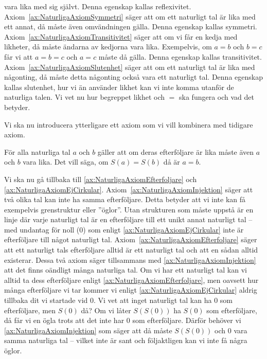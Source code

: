 vara lika med sig självt.
Denna egenskap kallas reflexivitet.
Axiom~\ref{ax:NaturligaAxiomSymmetri} säger att om ett naturligt tal är lika
med ett annat, då måste även omvändningen gälla.
Denna egenskap kallas symmetri.
Axiom~\ref{ax:NaturligaAxiomTransitivitet} säger att om vi får en kedja med
likheter, då måste ändarna av kedjorna vara lika.
Exempelvis, om \(a=b\) och \(b=c\) får vi att \(a=b=c\) och \(a=c\) måste då
gälla.
Denna egenskap kallas transitivitet.
Axiom~\ref{ax:NaturligaAxiomSlutenhet} säger att om ett naturligt tal är lika
med någonting, då måste detta någonting också vara ett naturligt tal.
Denna egenskap kallas slutenhet, hur vi än använder likhet kan
vi inte komma utanför de naturliga talen.
Vi vet nu hur begreppet likhet och \(=\) ska fungera och vad det betyder.

Vi ska nu introducera ytterligare ett axiom som vi vill kombinera med
tidigare axiom.
\begin{axiom}\label{ax:NaturligaAxiomInjektion}
  För alla naturliga tal \(a\) och \(b\) gäller att om deras efterföljare är
  lika måste även \(a\) och \(b\) vara lika.
  Det vill säga, om \(S(a)=S(b)\) då är \(a=b\).
\end{axiom}
Vi ska nu gå tillbaka till \cref{ax:NaturligaAxiomEfterfoljare} och
\cref{ax:NaturligaAxiomEjCirkular}.
Axiom~\ref{ax:NaturligaAxiomInjektion} säger att två olika tal kan inte ha 
samma efterföljare.
Detta betyder att vi inte kan få exempelvis grenstruktur eller ''öglor''.
Utan strukturen som måste uppstå är en linje där varje naturligt tal är en 
efterföljare till ett unikt annat naturligt tal -- med undantag för noll 
(\(0\)) som enligt \cref{ax:NaturligaAxiomEjCirkular} inte är efterföljare 
till något naturligt tal.
Axiom~\ref{ax:NaturligaAxiomEfterfoljare} säger att ett naturligt tals 
efterföljare alltid är ett naturligt tal och att en sådan alltid existerar.
Dessa två axiom säger tillsammans med \cref{ax:NaturligaAxiomInjektion} att
det finns oändligt många naturliga tal.
Om vi har ett naturligt tal kan vi alltid ta dess efterföljare enligt 
\cref{ax:NaturligaAxiomEfterfoljare}, men oavsett hur många efterföljare 
vi tar kommer vi enligt \cref{ax:NaturligaAxiomEjCirkular} aldrig tillbaka 
dit vi startade vid \(0\).
Vi vet att inget naturligt tal kan ha \(0\) som efterföljare, men \(S(0)\) då?
Om vi låter \(S(S(0))\) ha \(S(0)\) som efterföljare, då får vi en ögla trots
att det inte har \(0\) som efterföljare.
Därför behöver vi \cref{ax:NaturligaAxiomInjektion} som säger att då måste
\(S(S(0))\) och \(0\) vara samma naturliga tal -- vilket inte är sant och
följaktligen kan vi inte få några öglor.

